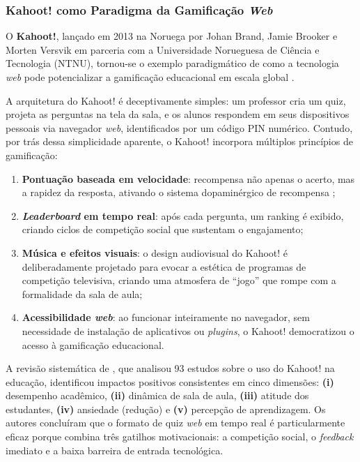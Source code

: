 \documentclass[
	12pt,
	openany,
	oneside,
	a4paper,
	english,
	brazil
]{abntex2}
\begin{document}
\subsubsection{Kahoot! como Paradigma da Gamificação \textit{Web}}

O \textbf{Kahoot!}, lançado em 2013 na Noruega por Johan Brand, Jamie Brooker e Morten Versvik em parceria com a Universidade Norueguesa de Ciência e Tecnologia (NTNU), tornou-se o exemplo paradigmático de como a tecnologia \textit{web} pode potencializar a gamificação educacional em escala global \cite{wang2020kahoot}.

A arquitetura do Kahoot! é deceptivamente simples: um professor cria um quiz, projeta as perguntas na tela da sala, e os alunos respondem em seus dispositivos pessoais via navegador \textit{web}, identificados por um código PIN numérico. Contudo, por trás dessa simplicidade aparente, o Kahoot! incorpora múltiplos princípios de gamificação:

\begin{enumerate}
  \item \textbf{Pontuação baseada em velocidade}: recompensa não apenas o acerto, mas a rapidez da resposta, ativando o sistema dopaminérgico de recompensa \cite{ryan2000};
  \item \textbf{\textit{Leaderboard} em tempo real}: após cada pergunta, um ranking é exibido, criando ciclos de competição social que sustentam o engajamento;
  \item \textbf{Música e efeitos visuais}: o design audiovisual do Kahoot! é deliberadamente projetado para evocar a estética de programas de competição televisiva, criando uma atmosfera de ``jogo'' que rompe com a formalidade da sala de aula;
  \item \textbf{Acessibilidade \textit{web}}: ao funcionar inteiramente no navegador, sem necessidade de instalação de aplicativos ou \textit{plugins}, o Kahoot! democratizou o acesso à gamificação educacional.
\end{enumerate}

A revisão sistemática de , que analisou 93 estudos sobre o uso do Kahoot! na educação, identificou impactos positivos consistentes em cinco dimensões: \textbf{(i)} desempenho acadêmico, \textbf{(ii)} dinâmica de sala de aula, \textbf{(iii)} atitude dos estudantes, \textbf{(iv)} ansiedade (redução) e \textbf{(v)} percepção de aprendizagem. Os autores concluíram que o formato de quiz \textit{web} em tempo real é particularmente eficaz porque combina três gatilhos motivacionais: a competição social, o \textit{feedback} imediato e a baixa barreira de entrada tecnológica.
\end{document}
